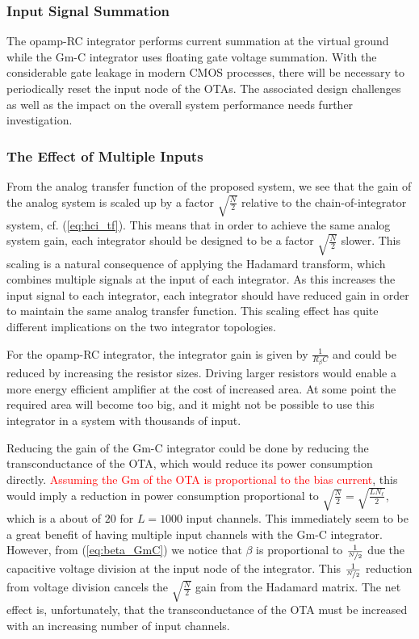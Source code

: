 \subsubsection*{Input Signal Summation}
The opamp-RC integrator performs current summation at the virtual ground while the Gm-C integrator uses floating gate voltage summation. With the considerable gate leakage in modern CMOS processes, there will be necessary to periodically reset the input node of the OTAs. The associated design challenges as well as the impact on the overall system performance needs further investigation.

\subsubsection*{The Effect of Multiple Inputs}
From the analog transfer function of the proposed system, we see that the gain of the analog system is scaled up by a factor $\sqrt{\frac{N}{2}}$ relative to the chain-of-integrator system, cf. (\ref{eq:hci_tf}). This means that in order to achieve the same analog system gain, each integrator should be designed to be a factor $\sqrt{\frac{N}{2}}$ slower. This scaling is a natural consequence of applying the Hadamard transform, which combines multiple signals at the input of each integrator. As this increases the input signal to each integrator, each integrator should have reduced gain in order to maintain the same analog transfer function. This scaling effect has quite different implications on the two integrator topologies.

For the opamp-RC integrator, the integrator gain is given by $\frac{1}{R_\beta C}$ and could be reduced by increasing the resistor sizes. Driving larger resistors would enable a more energy efficient amplifier at the cost of increased area. At some point the required area will become too big, and it might not be possible to use this integrator in a system with thousands of input.

Reducing the gain of the Gm-C integrator could be done by reducing the transconductance of the OTA, which would reduce its power consumption directly. \textcolor{red}{Assuming the Gm of the OTA is proportional to the bias current}, this would imply a reduction in power consumption proportional to $\sqrt{\frac{N}{2}} = \sqrt{\frac{LN_\ell}{2}}$, which is a about of $20$ for $L=1000$ input channels. This immediately seem to be a great benefit of having multiple input channels with the Gm-C integrator. However, from (\ref{eq:beta_GmC}) we notice that $\beta$ is proportional to $\frac{1}{\nicefrac{N}{2}}$ due the capacitive voltage division at the input node of the integrator. This $\frac{1}{\nicefrac{N}{2}}$ reduction from voltage division cancels the $\sqrt{\frac{N}{2}}$ gain from the Hadamard matrix. The net effect is, unfortunately, that the transconductance of the OTA must be increased with an increasing number of input channels.

